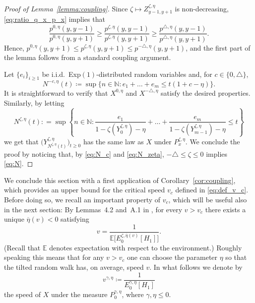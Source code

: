 \documentclass[12pt,reqno,oneside]{amsart}
\numberwithin{equation}{section}
\theoremstyle{definition}
\theoremstyle{remark}
\newcommand{\N}{\mathbb{N}}
\newcommand{\E}{\mathbb{E}}
\begin{document}
\begin{proof}[Proof of Lemma~\ref{lemma:coupling}]
  Since $\zeta \mapsto Z^{\zeta, \eta}_{y-1,y+1}$ is non-decreasing,
  \eqref{eq:ratio_q_x_p_x} implies that
  \begin{equation*}
    \frac{p^{0,\eta}(y,y-1)}{p^{0,\eta}(y,y+1)}
    \geq \frac{p^{\zeta,\eta}(y,y-1)}{p^{\zeta,\eta}(y,y+1)}
    \geq \frac{p^{\triangle,\eta}(y,y-1)}{p^{\triangle,\eta}(y,y+1)}.
  \end{equation*}
  Hence,
  $p^{0,\eta} (y,y+1) \leq p^{\zeta,\eta} (y,y+1) \leq  p^{-
    \triangle,\eta}(y,y+1)$, and the first part of the lemma  follows from a
  standard coupling argument.

  Let $\{e_i\}_{i \geq 1}$ be i.i.d.~Exp$(1)$-distributed random variables
  and, for $c \in \{0,\triangle\}$,
  \begin{equation}
    \label{eq:N_c}
    N^{-c,\eta}(t)\coloneq \sup \{n \in \N: e_1+\dots+e_m \leq t(1+ c-\eta)\}.
  \end{equation}
  It is straightforward to verify that $X^{0,\eta}$ and
  $X^{-\triangle, \eta}$ satisfy the desired properties. Similarly, by letting
  \begin{equation}\label{eq:N_zeta}
    N^{\zeta,\eta}(t):
    = \sup \left\{n \in \N: \frac{e_1}{1- \zeta(Y_0^{\zeta,\eta})-\eta}+
      \dots + \frac{e_m}{1- \zeta(Y_{m-1}^{\zeta,\eta})-\eta}\leq t\right\}
  \end{equation}
  we get that $\big(Y^{\zeta, \eta}_{N^{\zeta,\eta}(t)}\big)_{t \geq 0}$
  has the same law as $X$ under $P_x^{\zeta, \eta}$. We conclude the proof by
  noticing that, by \eqref{eq:N_c} and \eqref{eq:N_zeta},
  $-\triangle \leq \zeta \leq 0$ implies \eqref{eq:N}.
\end{proof}

We conclude this section with a first application of
Corollary~\ref{cor:coupling}, which provides an upper bound for the critical
speed $v_c$ defined in \eqref{eq:def_v_c}. Before doing so, we recall an
important property of $v_c$, which will be useful also in the next section:
By Lemmas~4.2 and~A.1 in \cite{CD20}, for every $v>v_c$ there exists a unique
$\overline{\eta}(v)<0$ satisfying
\begin{equation}\label{eq:veltilting}
  v=\frac{1}{\E\Big[E_0^{\zeta, \overline{\eta}(v) }[H_1]\Big]}.
\end{equation}
(Recall that $\E$ denotes expectation with respect to the environment.) Roughly
speaking this means that for any $v>v_c$ one can choose the parameter $\eta$ so that the
tilted random walk has, on average, speed $v$.
In what follows we denote by
\begin{equation}\label{eq:def_v_gamma}
  v^{\gamma, \eta}\coloneq \frac{1}{E_0^{\gamma,\eta}[H_1]}
\end{equation}
the speed of $X$ under the measure $P_0^{\gamma, \eta}$,
where $\gamma , \eta \le 0$.
\end{document}
